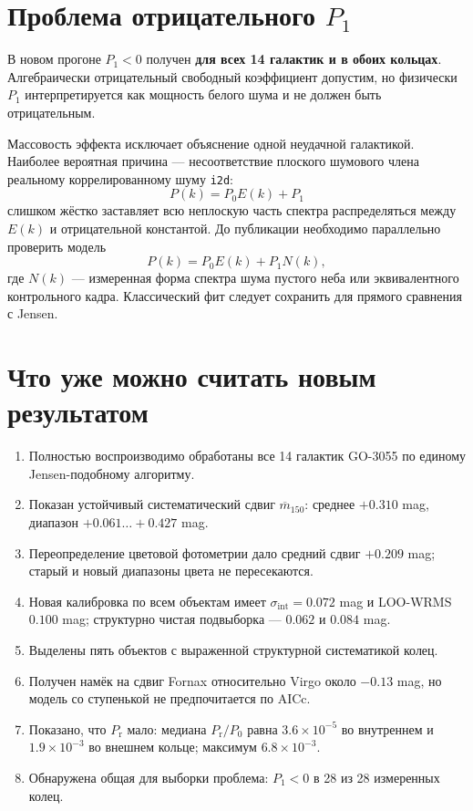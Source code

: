 \documentclass[12pt,a4paper]{article}
\begin{document}
\section{Проблема отрицательного \(P_1\)}

В новом прогоне \(P_1<0\) получен \textbf{для всех 14
галактик и в обоих кольцах}. Алгебраически отрицательный
свободный коэффициент допустим, но физически \(P_1\)
интерпретируется как мощность белого шума и не должен быть
отрицательным.

Массовость эффекта исключает объяснение одной неудачной
галактикой. Наиболее вероятная причина --- несоответствие
плоского шумового члена реальному коррелированному шуму
\texttt{i2d}:
\begin{equation}
    P(k)=P_0E(k)+P_1
\end{equation}
слишком жёстко заставляет всю неплоскую часть спектра
распределяться между \(E(k)\) и отрицательной константой.
До публикации необходимо параллельно проверить модель
\begin{equation}
    P(k)=P_0E(k)+P_1N(k),
\end{equation}
где \(N(k)\) --- измеренная форма спектра шума пустого неба
или эквивалентного контрольного кадра. Классический фит
следует сохранить для прямого сравнения с Jensen.

\section{Что уже можно считать новым результатом}

\begin{enumerate}
    \item Полностью воспроизводимо обработаны все 14
    галактик GO-3055 по единому Jensen-подобному алгоритму.
    \item Показан устойчивый систематический сдвиг
    \(\overline m_{150}\): среднее \(+0.310\) mag, диапазон
    \(+0.061\ldots+0.427\) mag.
    \item Переопределение цветовой фотометрии дало средний
    сдвиг \(+0.209\) mag; старый и новый диапазоны цвета не
    пересекаются.
    \item Новая калибровка по всем объектам имеет
    \(\sigma_{\mathrm{int}}=0.072\) mag и LOO-WRMS
    \(0.100\) mag; структурно чистая подвыборка ---
    \(0.062\) и \(0.084\) mag.
    \item Выделены пять объектов с выраженной структурной
    систематикой колец.
    \item Получен намёк на сдвиг Fornax относительно Virgo
    около \(-0.13\) mag, но модель со ступенькой не
    предпочитается по AICc.
    \item Показано, что \(P_{\mathrm r}\) мало:
    медиана \(P_{\mathrm r}/P_0\) равна
    \(3.6\times10^{-5}\) во внутреннем и
    \(1.9\times10^{-3}\) во внешнем кольце; максимум
    \(6.8\times10^{-3}\).
    \item Обнаружена общая для выборки проблема:
    \(P_1<0\) в 28 из 28 измеренных колец.
\end{enumerate}
\end{document}
